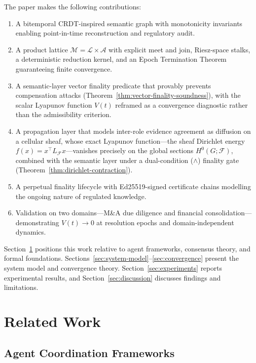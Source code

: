 \documentclass[11pt]{article}
\begin{document}
The paper makes the following contributions:
\begin{enumerate}
  \item A bitemporal CRDT-inspired semantic graph with monotonicity invariants enabling point-in-time reconstruction and regulatory audit.
  \item A product lattice $\mathcal{M} = \mathcal{L} \times \mathcal{A}$ with explicit meet and join, Riesz-space stalks, a deterministic reduction kernel, and an Epoch Termination Theorem guaranteeing finite convergence.
  \item A semantic-layer vector finality predicate that provably prevents compensation attacks (Theorem~\ref{thm:vector-finality-soundness}), with the scalar Lyapunov function $V(t)$ reframed as a convergence diagnostic rather than the admissibility criterion.
  \item A propagation layer that models inter-role evidence agreement as diffusion on a cellular sheaf, whose exact Lyapunov function---the sheaf Dirichlet energy $f(x) = x^\top L_{\mathcal{F}} x$---vanishes precisely on the global sections $H^0(G;\mathcal{F})$, combined with the semantic layer under a dual-condition ($\wedge$) finality gate (Theorem~\ref{thm:dirichlet-contraction}).
  \item A perpetual finality lifecycle with Ed25519-signed certificate chains modelling the ongoing nature of regulated knowledge.
  \item Validation on two domains---M\&A due diligence and financial consolidation---demonstrating $V(t) \to 0$ at resolution epochs and domain-independent dynamics.
\end{enumerate}

Section~\ref{sec:related} positions this work relative to agent frameworks, consensus theory, and formal foundations.
Sections~\ref{sec:system-model}--\ref{sec:convergence} present the system model and convergence theory.
Section~\ref{sec:experiments} reports experimental results, and Section~\ref{sec:discussion} discusses findings and limitations.

\section{Related Work}
\label{sec:related}

\subsection{Agent Coordination Frameworks}
\end{document}
